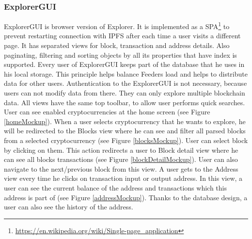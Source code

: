 \subsubsection{ExplorerGUI}
ExplorerGUI is browser version of Explorer. It is implemented as a SPA\footnote{\url{https://en.wikipedia.org/wiki/Single-page_application}} to prevent restarting connection with IPFS after each time a user visits a different page. It has separated views for block, transaction and address details. Also paginating, filtering and sorting objects by all its properties that have index is supported. Every user of ExplorerGUI keeps part of the database that he uses in his local storage. This principle helps balance Feeders load and helps to distribute data for other users.  Authentication to the ExplorerGUI is not necessary, because users can not modify data from there. They can only explore multiple blockchain data. All views have the same top toolbar, to allow user performs quick searches. User can see enabled cryptocurrencies at the home screen (see Figure \ref{homeMockup}). When a user selects cryptocurrency that he wants to explore, he will be redirected to the Blocks view where he can see and filter all parsed blocks from a selected cryptocurrency (see Figure \ref{blocksMockup}). User can select block by clicking on them. This action redirects a user to Block detail view where he can see all blocks transactions (see Figure \ref{blockDetailMockup}). User can also navigate to the next/previous block from this view. A user gets to the Address view every time he clicks on transaction input or output address. In this view, a user can see the current balance of the address and transactions which this address is part of (see Figure \ref{addressMockup}). Thanks to the database design, a user can also see the history of the address. 


